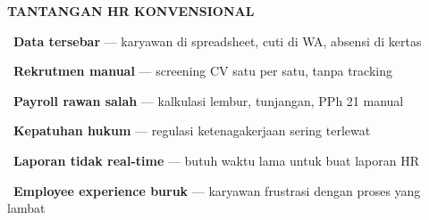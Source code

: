 \documentclass[a4paper]{article}
\begin{document}
\noindent
\begin{minipage}[t]{0.485\textwidth}
    \colorbox{RedLight}{%
        \begin{minipage}{\dimexpr\textwidth-14pt}
            \vspace{5pt}
            {\fontsize{10}{13}\selectfont\bfseries\color{RedText} TANTANGAN HR KONVENSIONAL}
            \vspace{5pt}
        \end{minipage}}
    \vspace{6pt}

    {\fontsize{9.5}{13}\selectfont\color{TextDark}%
    \textbullet\ \textbf{Data tersebar} — karyawan di spreadsheet, cuti di WA, absensi di kertas\par\vspace{4pt}%
    \textbullet\ \textbf{Rekrutmen manual} — screening CV satu per satu, tanpa tracking\par\vspace{4pt}%
    \textbullet\ \textbf{Payroll rawan salah} — kalkulasi lembur, tunjangan, PPh 21 manual\par\vspace{4pt}%
    \textbullet\ \textbf{Kepatuhan hukum} — regulasi ketenagakerjaan sering terlewat\par\vspace{4pt}%
    \textbullet\ \textbf{Laporan tidak real-time} — butuh waktu lama untuk buat laporan HR\par\vspace{4pt}%
    \textbullet\ \textbf{Employee experience buruk} — karyawan frustrasi dengan proses yang lambat}%
\end{minipage}%
\hfill%
\end{document}
